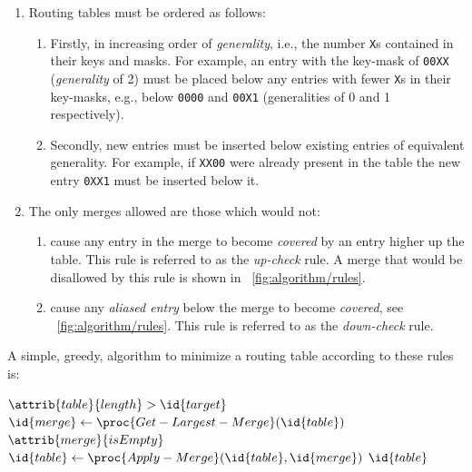 \documentclass[conference]{IEEEtran}
\newcommand{\mytt}[1]{\texttt{\footnotesize#1}}
\begin{document}
  \begin{enumerate}[\IEEEsetlabelwidth{3)}]
    \item Routing tables must be ordered as follows:
      \begin{enumerate}[\IEEEsetlabelwidth{a)}]
        \item Firstly, in increasing order of \textit{generality}, i.e., the number \mytt{X}s contained in their keys and masks.
              For example, an entry with the key-mask of \mytt{00XX} (\textit{generality} of 2) must be placed below any entries with fewer \mytt{X}s in their key-masks, e.g., below \mytt{0000} and \mytt{00X1} (generalities of 0 and 1 respectively).
        \item Secondly, new entries must be inserted below existing entries of equivalent generality.
              For example, if \mytt{XX00} were already present in the table the new entry \mytt{0XX1} must be inserted below it.
      \end{enumerate}
    \item The only merges allowed are those which would not:
      \begin{enumerate}[\IEEEsetlabelwidth{b)}]
        \item cause any entry in the merge to become \textit{covered} by an entry higher up the table.
              This rule is referred to as the \textit{up-check} rule.
              A merge that would be disallowed by this rule is shown in \figurename~\ref{fig:algorithm/rules}.
            \item cause any \textit{aliased entry} below the merge to become \textit{covered}, see \figurename~\ref{fig:algorithm/rules}.
              This rule is referred to as the \textit{down-check} rule.
      \end{enumerate}
  \end{enumerate}

  A simple, greedy, algorithm to minimize a routing table according to these rules is:\par\nopagebreak
  \begin{codebox}
    \li \While $\attrib{table}{length} >  \id{target}$
    \li \Do $\id{merge} \gets \proc{Get-Largest-Merge}(\id{table})$
    \li     \If $\attrib{merge}{isEmpty}$
    \li     \Then {} \End
    \li     $\id{table} \gets \proc{Apply-Merge}(\id{table}, \id{merge})$
        \End
    \li \Return $\id{table}$
  \end{codebox}
\end{document}
